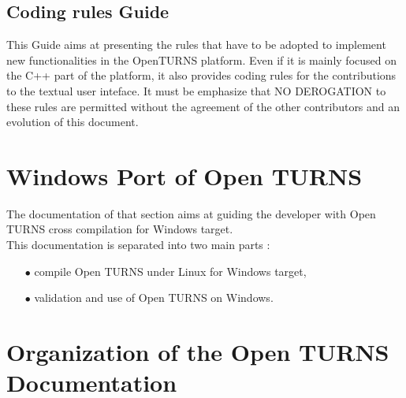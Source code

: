 \documentclass[11pt]{article}
\begin{document}
\subsection{Coding rules Guide}

This Guide aims at presenting the rules that have to be adopted to implement new functionalities in the OpenTURNS platform. Even if it is mainly focused on the C++ part of the platform, it also provides coding rules for the contributions to the textual user inteface. It must be emphasize that NO DEROGATION to these rules are permitted without the agreement of the other contributors and an evolution of this document.



\section{Windows Port of Open TURNS}

The documentation of that section aims at  guiding the developer with Open TURNS cross compilation for Windows target.\\

This documentation is separated into two main parts :
\begin{itemize}
\item[$\bullet$]  compile Open TURNS under Linux for Windows target,
\item[$\bullet$]  validation and use of Open TURNS on Windows.
\end{itemize}










\section{Organization of the Open TURNS Documentation}
\end{document}
